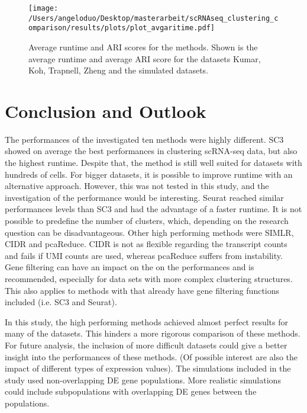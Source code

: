 \documentclass[12pt, a4paper]{article}\usepackage[]{graphicx}\usepackage[]{color}
\begin{document}
\begin{figure}[H]
\begin{center}
\texttt{[image: /Users/angeloduo/Desktop/masterarbeit/scRNAseq\_clustering\_comparison/results/plots/plot\_avgaritime.pdf]}
\caption{Average runtime and ARI scores for the methods. Shown is the average runtime and average ARI score for the datasets Kumar, Koh, Trapnell, Zheng and the simulated datasets.}
\label{fig:avgtimeari}
\end{center}
\end{figure}
\newpage
\section{Conclusion and Outlook} 
The performances of the investigated ten methods were highly different. SC3 showed on average the best performances in clustering scRNA-seq data, but also the highest runtime. Despite that, the method is still well suited for datasets with hundreds of cells.  For bigger datasets, it is possible to improve runtime with an alternative approach. However, this was not tested in this study, and the investigation of the performance would be interesting. Seurat reached similar performances levels than SC3 and had the advantage of a faster runtime.  It is not possible to predefine the number of clusters, which, depending on the research question can be disadvantageous. Other high performing methods were SIMLR, CIDR and pcaReduce. CIDR is not as flexible regarding the transcript counts and fails if UMI counts are used, whereas pcaReduce suffers from instability. 
Gene filtering can have an impact on the on the performances and is recommended, especially for data sets with more complex clustering structures. This also applies to methods with that already have gene filtering functions included (i.e. SC3 and Seurat).

In this study, the high performing methods achieved almost perfect results for many of the datasets. This hinders a more rigorous comparison of these methods. For future analysis, the inclusion of more difficult datasets could give a better insight into the performances of these methods. (Of possible interest are also the impact of different types of expression values). The simulations included in the study used non-overlapping DE gene populations. More realistic simulations could include subpopulations with overlapping DE genes between the populations. 
\end{document}
